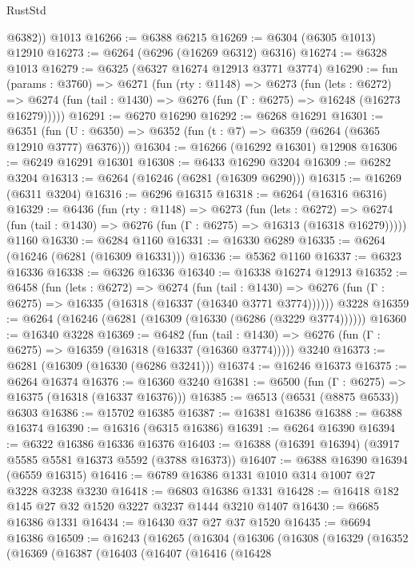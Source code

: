 \begin{lexlean}{RustStd}
\begin{coremodule}
        @6382))
    @1013
@16266 := @6388 @6215
@16269 := @6304 (@6305 @1013) @12910
@16273 := @6264 (@6296 (@16269 @6312) @6316)
@16274 := @6328 @1013
@16279 := @6325 (@6327 @16274 @12913 @3771 @3774)
@16290 := fun (params : @3760) =>
  @6271
    (fun (rty : @1148) =>
    @6273
      (fun (lets : @6272) =>
      @6274 (fun (tail : @1430) => @6276 (fun (Γ : @6275) => @16248 (@16273 @16279)))))
@16291 := @6270 @16290
@16292 := @6268 @16291
@16301 := @6351
    (fun (U : @6350) => @6352 (fun (t : @7) => @6359 (@6264 (@6365 @12910 @3777) @6376)))
@16304 := @16266 (@16292 @16301) @12908
@16306 := @6249 @16291 @16301
@16308 := @6433 @16290 @3204
@16309 := @6282 @3204
@16313 := @6264 (@16246 (@6281 (@16309 @6290)))
@16315 := @16269 (@6311 @3204)
@16316 := @6296 @16315
@16318 := @6264 (@16316 @6316)
@16329 := @6436
    (fun (rty : @1148) =>
    @6273
      (fun (lets : @6272) =>
      @6274 (fun (tail : @1430) => @6276 (fun (Γ : @6275) => @16313 (@16318 @16279)))))
    @1160
@16330 := @6284 @1160
@16331 := @16330 @6289
@16335 := @6264 (@16246 (@6281 (@16309 @16331)))
@16336 := @5362 @1160
@16337 := @6323 @16336
@16338 := @6326 @16336
@16340 := @16338 @16274 @12913
@16352 := @6458
    (fun (lets : @6272) =>
    @6274
      (fun (tail : @1430) =>
      @6276 (fun (Γ : @6275) => @16335 (@16318 (@16337 (@16340 @3771 @3774))))))
    @3228
@16359 := @6264 (@16246 (@6281 (@16309 (@16330 (@6286 (@3229 @3774))))))
@16360 := @16340 @3228
@16369 := @6482
    (fun (tail : @1430) => @6276 (fun (Γ : @6275) => @16359 (@16318 (@16337 (@16360 @3774)))))
    @3240
@16373 := @6281 (@16309 (@16330 (@6286 @3241)))
@16374 := @16246 @16373
@16375 := @6264 @16374
@16376 := @16360 @3240
@16381 := @6500 (fun (Γ : @6275) => @16375 (@16318 (@16337 @16376)))
@16385 := @6513 (@6531 (@8875 @6533)) @6303
@16386 := @15702 @16385
@16387 := @16381 @16386
@16388 := @6388 @16374
@16390 := @16316 (@6315 @16386)
@16391 := @6264 @16390
@16394 := @6322 @16386 @16336 @16376
@16403 := @16388 (@16391 @16394) (@3917 @5585 @5581 @16373 @5592 (@3788 @16373))
@16407 := @6388 @16390 @16394 (@6559 @16315)
@16416 := @6789 @16386 @1331 @1010 @314 @1007 @27 @3228 @3238 @3230
@16418 := @6803 @16386 @1331
@16428 := @16418 @182 @145 @27 @32 @1520 @3227 @3237 @1444 @3210 @1407
@16430 := @6685 @16386 @1331
@16434 := @16430 @37 @27 @37 @1520
@16435 := @6694 @16386
@16509 := @16243
    (@16265
      (@16304
        (@16306
          (@16308
            (@16329
              (@16352
                (@16369
                  (@16387
                    (@16403
                      (@16407
                        (@16416
                          (@16428

\end{coremodule}
\end{lexlean}
